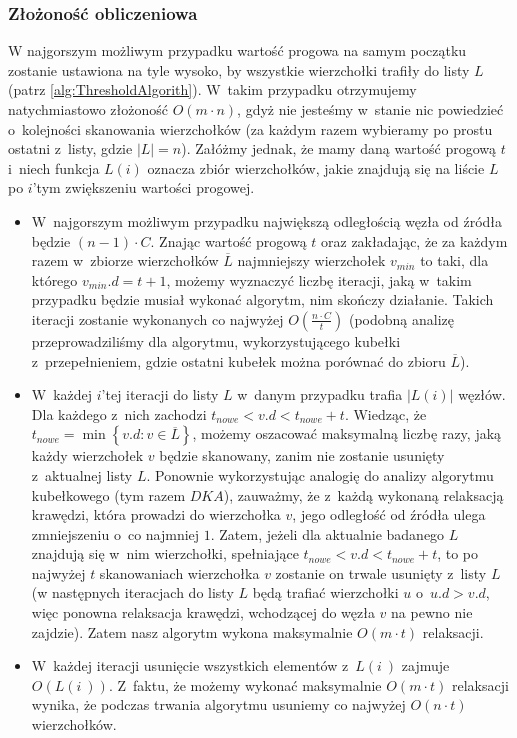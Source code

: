 \subsubsection{Złożoność obliczeniowa}

W najgorszym możliwym przypadku wartość progowa na samym początku zostanie ustawiona na tyle wysoko, by wszystkie wierzchołki trafiły do listy $L$ (patrz \ref{alg:ThresholdAlgorith}). W~takim przypadku otrzymujemy natychmiastowo złożoność $O \left( m \cdot n \right)$, gdyż nie jesteśmy w~stanie nic powiedzieć o~kolejności skanowania wierzchołków (za każdym razem wybieramy po prostu ostatni z~listy, gdzie $ \left| L \right| = n $). Załóżmy jednak, że mamy daną wartość progową $t$ i~niech funkcja $L \left( i \right)$ oznacza zbiór wierzchołków, jakie znajdują się na liście $L$ po $i$'tym zwiększeniu wartości progowej.

\begin{itemize}
\item W~najgorszym możliwym przypadku największą odległością węzła od źródła będzie $ \left( n - 1 \right) \cdot C $. Znając wartość progową $t$ oraz zakładając, że za każdym razem w~zbiorze wierzchołków $\overline{L}$ najmniejszy wierzchołek $v_{min}$ to taki, dla którego $v_{min}.d = t + 1$, możemy wyznaczyć liczbę iteracji, jaką w~takim przypadku będzie musiał wykonać algorytm, nim skończy działanie. Takich iteracji zostanie wykonanych co najwyżej $ O \left( \frac{n \cdot C}{t}\right)$ (podobną analizę przeprowadziliśmy dla algorytmu, wykorzystującego kubełki z~przepełnieniem, gdzie ostatni kubełek można porównać do zbioru $\overline{L}$).
\item W~każdej $i$'tej iteracji do listy $L$ w~danym przypadku trafia $\left| L \left( i \right) \right|$ węzłów. Dla każdego z~nich zachodzi $t_{nowe} < v.d < t_{nowe} + t$. Wiedząc, że $t_{nowe} = \min \left\{ v.d : v \in \overline{L} \right\}$, możemy oszacować maksymalną liczbę razy, jaką każdy wierzchołek $v$ będzie skanowany, zanim nie zostanie usunięty z~aktualnej listy $L$. Ponownie wykorzystując analogię do analizy algorytmu kubełkowego (tym razem $DKA$), zauważmy, że z~każdą wykonaną relaksacją krawędzi, która prowadzi do wierzchołka $v$, jego odległość od źródła ulega zmniejszeniu o~co najmniej $1$. Zatem, jeżeli dla aktualnie badanego $L$ znajdują się w~nim wierzchołki, spełniające $t_{nowe} < v.d < t_{nowe} + t $, to po najwyżej $t$ skanowaniach wierzchołka $v$ zostanie on trwale usunięty z~listy $L$ (w następnych iteracjach do listy $L$ będą trafiać wierzchołki $u$ o~$u.d > v.d$, więc ponowna relaksacja krawędzi, wchodzącej do węzła $v$ na pewno nie zajdzie). Zatem nasz algorytm wykona maksymalnie $ O \left( m \cdot t \right)$ relaksacji.
\item W~każdej iteracji usunięcie wszystkich elementów z~$L \left( i~\right)$ zajmuje $ O \left( L \left( i~\right) \right)$. Z~faktu, że możemy wykonać maksymalnie $O \left( m \cdot t \right)$ relaksacji wynika, że podczas trwania algorytmu usuniemy co najwyżej $O \left( n \cdot t \right)$ wierzchołków.
\end{itemize}

